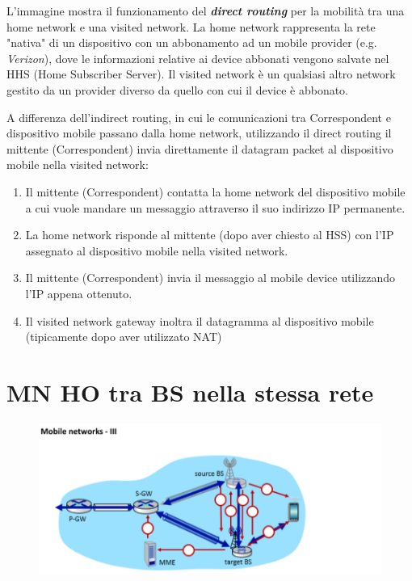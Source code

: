 L'immagine mostra il funzionamento del \textbf{\emph{direct routing}} per la mobilità tra una home network e una visited network. La home network rappresenta la rete "nativa" di un dispositivo con un abbonamento ad un mobile provider (e.g. \textit{Verizon}), dove le informazioni relative ai device abbonati vengono salvate nel HHS (Home Subscriber Server). Il visited network è un qualsiasi altro network gestito da un provider diverso da quello con cui il device è abbonato.

A differenza dell'indirect routing, in cui le comunicazioni tra Correspondent e dispositivo mobile passano dalla home network, utilizzando il direct routing il mittente (Correspondent) invia direttamente il datagram packet al dispositivo mobile nella visited network:
\begin{enumerate}
    \item Il mittente (Correspondent) contatta la home network del dispositivo mobile a cui vuole mandare un messaggio attraverso il suo indirizzo IP permanente.
    \item La home network risponde al mittente (dopo aver chiesto al HSS) con l'IP assegnato al dispositivo mobile nella visited network.
    \item Il mittente (Correspondent) invia il messaggio al mobile device utilizzando l'IP appena ottenuto.
    \item Il visited network gateway inoltra il datagramma al dispositivo mobile (tipicamente dopo aver utilizzato NAT)
\end{enumerate}


\section{MN HO tra BS nella stessa rete}

\begin{figure}[htbp]
   \centering
   \includegraphics{images/questions/Schermata del 2023-11-02 10-47-37.png}
   \label{fig:dom2.6}
\end{figure}

